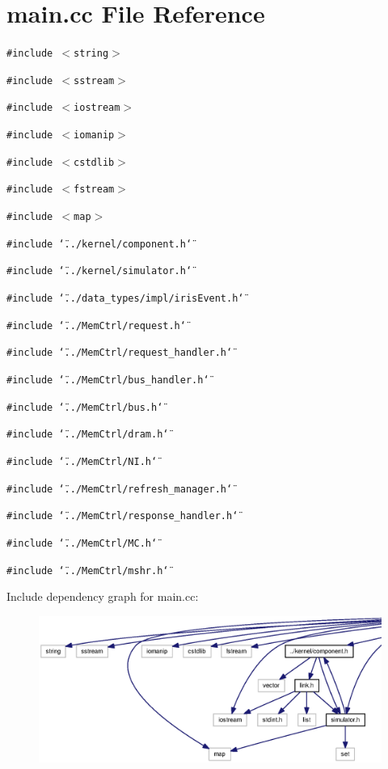 \section{main.cc File Reference}
\label{main_8cc}
{\tt \#include $<$string$>$}\par
{\tt \#include $<$sstream$>$}\par
{\tt \#include $<$iostream$>$}\par
{\tt \#include $<$iomanip$>$}\par
{\tt \#include $<$cstdlib$>$}\par
{\tt \#include $<$fstream$>$}\par
{\tt \#include $<$map$>$}\par
{\tt \#include \char`\"{}../kernel/component.h\char`\"{}}\par
{\tt \#include \char`\"{}../kernel/simulator.h\char`\"{}}\par
{\tt \#include \char`\"{}../data\_\-types/impl/irisEvent.h\char`\"{}}\par
{\tt \#include \char`\"{}../MemCtrl/request.h\char`\"{}}\par
{\tt \#include \char`\"{}../MemCtrl/request\_\-handler.h\char`\"{}}\par
{\tt \#include \char`\"{}../MemCtrl/bus\_\-handler.h\char`\"{}}\par
{\tt \#include \char`\"{}../MemCtrl/bus.h\char`\"{}}\par
{\tt \#include \char`\"{}../MemCtrl/dram.h\char`\"{}}\par
{\tt \#include \char`\"{}../MemCtrl/NI.h\char`\"{}}\par
{\tt \#include \char`\"{}../MemCtrl/refresh\_\-manager.h\char`\"{}}\par
{\tt \#include \char`\"{}../MemCtrl/response\_\-handler.h\char`\"{}}\par
{\tt \#include \char`\"{}../MemCtrl/MC.h\char`\"{}}\par
{\tt \#include \char`\"{}../MemCtrl/mshr.h\char`\"{}}\par


Include dependency graph for main.cc:\nopagebreak
\begin{figure}[H]
\begin{center}
\leavevmode
\includegraphics[width=420pt]{main_8cc__incl}
\end{center}
\end{figure}
